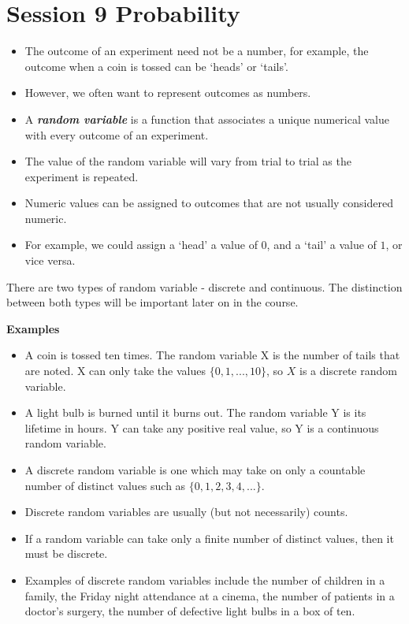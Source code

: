 \documentclass[12pt]{report}
\begin{document}
\section*{Session 9 Probability}
{ \Large
	\begin{itemize} \item The outcome of an experiment need not be a number, for example, the outcome when a coin is tossed can be `heads' or `tails'. \item
		However, we often want to represent outcomes as numbers. \item
		A \textbf{\emph{random variable}} is a function that associates a unique numerical value with every outcome of an experiment.
		\item The value of the random variable will vary from trial to trial as the experiment is repeated.
		\item Numeric values can be assigned to outcomes that are not usually considered numeric. \item For example, we could assign a `head' a value of $0$, and a `tail' a value of $1$, or vice versa.
	\end{itemize}
}
{ \Large
	There are two types of random variable - discrete and continuous. The distinction between both types will be important later on in the course.\\ \bigskip
	
	\textbf{Examples}
	\begin{itemize}
		\item A coin is tossed ten times. The random variable X is the number of tails that are noted.
		X can only take the values $\{0, 1, ..., 10\}$, so $X$ is a discrete random variable.
		\item A light bulb is burned until it burns out. The random variable Y is its lifetime in hours.
		Y can take any positive real value, so Y is a continuous random variable.
	\end{itemize}
}

{ \Large
	\begin{itemize}
		\item A discrete random variable is one which may take on only a countable number of distinct values such as $\{0, 1, 2, 3, 4, ... \}$.\item Discrete random variables are usually (but not necessarily) counts. \item If a random variable can take only a finite number of distinct values, then it must be discrete. \item Examples of discrete random variables include the number of children in a family, the Friday night attendance at a cinema, the number of patients in a doctor's surgery, the number of defective light bulbs in a box of ten.
	\end{itemize}
}
\end{document}
